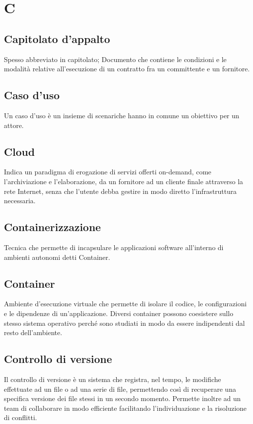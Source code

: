 \clearpage
\section*{C}

\subsection*{Capitolato d'appalto}
Spesso abbreviato in capitolato; Documento che contiene le condizioni e le modalità relative all'esecuzione di un contratto fra un committente e un fornitore.

\subsection*{Caso d'uso}
Un caso d’uso è un insieme di scenari\glosp che hanno in comune un obiettivo per un attore\glo.

\subsection*{Cloud}
Indica un paradigma di erogazione di servizi offerti on-demand, come l'archiviazione e l'elaborazione, da un fornitore ad un cliente finale attraverso la rete Internet, senza che l'utente debba gestire in modo diretto l'infrastruttura necessaria.

\subsection*{Containerizzazione}
Tecnica che permette di incapsulare le applicazioni software all’interno di ambienti autonomi detti Container\glo.

\subsection*{Container}
Ambiente d'esecuzione virtuale che permette di isolare il codice, le configurazioni e le dipendenze di un'applicazione. Diversi container possono coesistere sullo stesso sistema operativo perché sono studiati in modo da essere indipendenti dal resto dell'ambiente.

\subsection*{Controllo di versione}
Il controllo di versione è un sistema che registra, nel tempo, le modifiche effettuate ad un file o ad una serie di file, permettendo così di recuperare una specifica versione dei file stessi in un secondo momento.
Permette inoltre ad un team di collaborare in modo efficiente facilitando l'individuazione e la risoluzione di conflitti.

